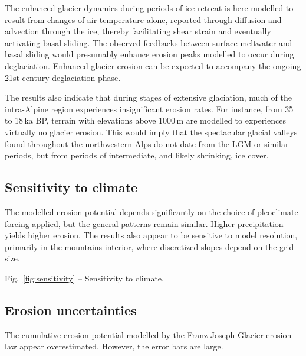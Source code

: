 \documentclass[utf8]{article}
\begin{document}
    The enhanced glacier dynamics during periods of ice retreat is here
    modelled to result from changes of air temperature alone, reported through
    diffusion and advection through the ice, thereby facilitating shear strain
    and eventually activating basal sliding. The observed feedbacks between
    surface meltwater and basal sliding would presumably enhance erosion peaks
    modelled to occur during deglaciation. Enhanced glacier erosion can be
    expected to accompany the ongoing 21st-century deglaciation phase.

    The results also indicate that during stages of extensive glaciation, much
    of the intra-Alpine region experiences insignificant erosion rates. For
    instance, from 35 to 18\,ka BP, terrain with elevations above 1000\,m are
    modelled to experiences virtually no glacier erosion. This would imply that
    the spectacular glacial valleys found throughout the northwestern Alps do
    not date from the LGM or similar periods, but from periods of intermediate,
    and likely shrinking, ice cover.


\subsection{Sensitivity to climate}
\label{sec:sensitivity}

    The modelled erosion potential depends significantly on the choice of
    pleoclimate forcing applied, but the general patterns remain similar.
    Higher precipitation yields higher erosion. The results also appear to be
    sensitive to model resolution, primarily in the mountains interior, where
    discretized slopes depend on the grid size.

    Fig.~\ref{fig:sensitivity} -- Sensitivity to climate.

\subsection{Erosion uncertainties}
\label{sec:powerlaws}

    The cumulative erosion potential modelled by the Franz-Joseph Glacier
    erosion law \citep{Herman.etal.2015} appear overestimated. However, the
    error bars are large.
\end{document}
